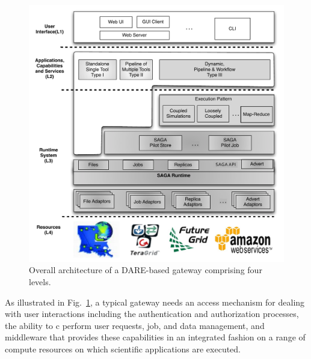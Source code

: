 \documentclass[]{svjour3}
\begin{document}
\begin{figure}
  \centering
  \includegraphics[scale=0.55]{figures/DARE-gateway-arch.pdf}
  \caption{\small {} Overall architecture of a DARE-based gateway comprising four levels. %
  }
  \label{fig:dare-arch} 
\end{figure}



As illustrated in Fig.~\ref{fig:dare-arch}, a typical gateway needs an
access mechanism for dealing with user interactions including the
authentication and authorization processes, the ability to c perform
user requests, job, and data management, and middleware that provides
these capabilities in an integrated fashion on a range of compute
resources on which scientific applications are executed.


\end{document}
